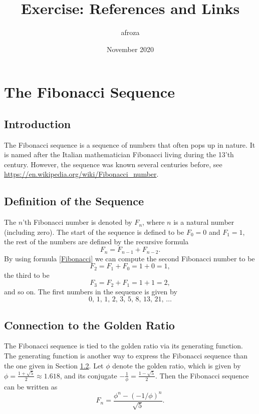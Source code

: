 \documentclass{article}
\title{Exercise: References and Links}
\author{afroza}
\date{November 2020}
\begin{document}
\maketitle

\section{The Fibonacci Sequence}
\subsection{Introduction}
The Fibonacci sequence is a sequence of numbers that often pops up in nature. It is named after the Italian mathematician Fibonacci living during the 13'th century. However, the sequence was known several centuries before, see \url{https://en.wikipedia.org/wiki/Fibonacci_number}.

\subsection{Definition of the Sequence}\label{Definition}
The $n$'th Fibonacci number is denoted by $F_{n}$, where $n$ is a natural number (including zero). The start of the sequence is defined to be $F_{0}=0$ and $F_{1}=1$, the rest of the numbers are defined by the recursive formula 
\begin{equation}\label{Fibonacci}
    F_{n}=F_{n-1}+F_{n-2}.
\end{equation}
By using formula \eqref{Fibonacci} we can compute the second Fibonacci number to be 
\[F_2=F_1+F_0=1+0=1,\]
the third to be 
\[F_3=F_2+F_1=1+1=2,\]
and so on.
The first numbers in the sequence is given by
\[0,\, 1,\, 1,\, 2,\, 3,\, 5,\, 8,\, 13,\, 21,\, \dots \]
\subsection{Connection to the Golden Ratio}
The Fibonacci sequence is tied to the golden ratio via its generating function. The generating function is another way to express the Fibonacci sequence than the one given in Section \ref{Definition}. Let $\phi$ denote the golden ratio, which is given by $\phi=\frac{1+\sqrt{5}}{2} \approx 1.618$, and its conjugate $-\frac{1}{\phi}=\frac{1-\sqrt{5}}{2}$. Then the Fibonacci sequence can be written as 
\[F_n = \frac{\phi^n-(-1/\phi)^n}{\sqrt{5}}.\]
\end{document}
